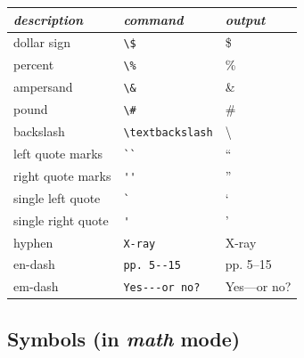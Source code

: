 \documentclass{article} %
\begin{document}
        \begin{center}
        \begin{tabular}{l|l|l}
        \emph{description} & \emph{command} & \emph{output}\\ \hline
        dollar sign & \verb!\$! & \$ \\
        percent & \verb!\%! & \% \\
        ampersand & \verb!\&! & \& \\
        pound & \verb!\#! & \# \\
        backslash & \verb!\textbackslash! & \textbackslash \\
        left quote marks & \verb!``! & `` \\
        right quote marks & \verb!''! & '' \\
        single left quote  & \verb!`! & ` \\
        single right quote  & \verb!'! & ' \\
        hyphen & \verb!X-ray! & X-ray\\
        en-dash & \verb!pp. 5--15! & pp. 5--15 \\
        em-dash & \verb!Yes---or no?! & Yes---or no? 
        \end{tabular}
        \end{center}

\subsection{Symbols (in \emph{math} mode)}
\end{document}
